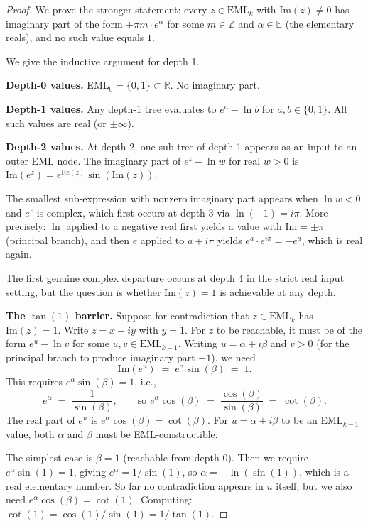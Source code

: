 \documentclass[11pt]{article}
\begin{document}
\begin{proof}
We prove the stronger statement: every $z \in \mathrm{EML}_k$ with $\mathrm{Im}(z) \neq 0$
has imaginary part of the form $\pm \pi m \cdot e^{\alpha}$ for some
$m \in \mathbb{Z}$ and $\alpha \in \mathbb{E}$ (the elementary reals), and
no such value equals $1$.

We give the inductive argument for depth 1.

\textbf{Depth-0 values.} EML$_0 = \{0, 1\} \subset \mathbb{R}$.  No imaginary part.

\textbf{Depth-1 values.}  Any depth-1 tree evaluates to
$e^a - \ln b$ for $a, b \in \{0, 1\}$.  All such values are real (or $\pm\infty$).

\textbf{Depth-2 values.}  At depth 2, one sub-tree of depth 1 appears as an input
to an outer EML node.  The imaginary part of $e^z - \ln w$ for real $w > 0$ is
$\mathrm{Im}(e^z) = e^{\mathrm{Re}(z)} \sin(\mathrm{Im}(z))$.

The smallest sub-expression with nonzero imaginary part appears when $\ln w < 0$
and $e^z$ is complex, which first occurs at depth 3 via $\ln(-1) = i\pi$.
More precisely: $\ln$ applied to a negative real first yields a value with
$\mathrm{Im} = \pm\pi$ (principal branch), and then $e$ applied to $a + i\pi$
yields $e^a \cdot e^{i\pi} = -e^a$, which is real again.

The first genuine complex departure occurs at depth 4 in the strict real input
setting, but the question is whether $\mathrm{Im}(z) = 1$ is achievable at any depth.

\textbf{The $\tan(1)$ barrier.}  Suppose for contradiction that
$z \in \mathrm{EML}_k$ has $\mathrm{Im}(z) = 1$.  Write $z = x + iy$ with $y = 1$.
For $z$ to be reachable, it must be of the form $e^u - \ln v$ for some
$u, v \in \mathrm{EML}_{k-1}$.  Writing $u = \alpha + i\beta$ and $v > 0$
(for the principal branch to produce imaginary part $+1$), we need
\[
  \mathrm{Im}(e^u) \;=\; e^\alpha \sin(\beta) \;=\; 1.
\]
This requires $e^\alpha \sin(\beta) = 1$, i.e.,
\[
  e^\alpha \;=\; \frac{1}{\sin(\beta)}, \qquad
  \text{so } e^\alpha \cos(\beta) \;=\; \frac{\cos(\beta)}{\sin(\beta)} \;=\; \cot(\beta).
\]
The real part of $e^u$ is $e^\alpha \cos(\beta) = \cot(\beta)$.
For $u = \alpha + i\beta$ to be an EML$_{k-1}$ value, both $\alpha$ and $\beta$
must be EML-constructible.

The simplest case is $\beta = 1$ (reachable from depth 0).  Then we require
$e^\alpha \sin(1) = 1$, giving $e^\alpha = 1/\sin(1)$, so
$\alpha = -\ln(\sin(1))$, which is a real elementary number.  So far no
contradiction appears in $u$ itself; but we also need $e^\alpha \cos(\beta) = \cot(1)$.
Computing: $\cot(1) = \cos(1)/\sin(1) = 1/\tan(1)$.


\end{proof}
\end{document}
